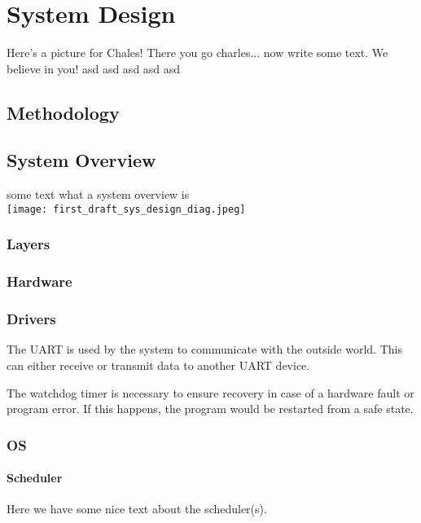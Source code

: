 \chapter{System Design}

Here's a picture for Chales!
There you go charles... now write some text. We believe in you!
asd
asd
asd
asd
asd

\section{Methodology}

\section{System Overview}
some text what a system overview is \\
\texttt{[image: first\_draft\_sys\_design\_diag.jpeg]}

\subsection{Layers}


\subsection{Hardware}

\subsection{Drivers}
\begin{description}[align=left]
	\item [\textbf{UART driver}] The UART is used by the system to communicate with the outside
	world. This can either receive or transmit data to another UART device.
	\item [\textbf{Watchdog timer driver}] The watchdog timer is necessary to ensure recovery
	in case of a hardware fault or program error. If this happens, the program would be restarted
	from a safe state. 
	
\end{description}

\subsection{OS}
\subsubsection{Scheduler}
Here we have some nice text about the scheduler(s).

